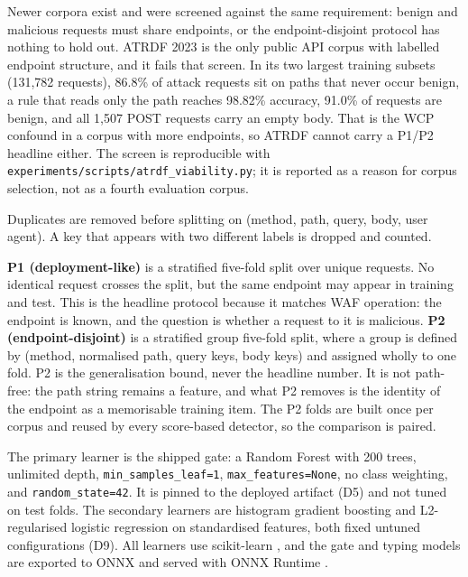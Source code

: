 \documentclass[preprint,11pt]{elsarticle}
\begin{document}
Newer corpora exist and were screened against the same requirement:
benign and malicious requests must share endpoints, or the
endpoint-disjoint protocol has nothing to hold out. ATRDF 2023
\citep{lavian2023atrdf} is the only public API corpus with labelled
endpoint structure, and it fails that screen. In its two largest
training subsets (131,782 requests), 86.8\% of attack requests sit on
paths that never occur benign, a rule that reads only the path reaches
98.82\% accuracy, 91.0\% of requests are benign, and all 1,507 POST
requests carry an empty body. That is the WCP confound in a corpus with
more endpoints, so ATRDF cannot carry a P1/P2 headline either. The
screen is reproducible with
\texttt{experiments/\allowbreak{}scripts/\allowbreak{}atrdf\_\allowbreak{}viability.\allowbreak{}py}; it is reported as a
reason for corpus selection, not as a fourth evaluation corpus.

Duplicates are removed before splitting on (method, path, query, body,
user agent). A key that appears with two different labels is dropped and
counted.

\textbf{P1 (deployment-like)} is a stratified five-fold split over
unique requests. No identical request crosses the split, but the same
endpoint may appear in training and test. This is the headline protocol
because it matches WAF operation: the endpoint is known, and the
question is whether a request to it is malicious. \textbf{P2
(endpoint-disjoint)} is a stratified group five-fold split, where a
group is defined by (method, normalised path, query keys, body keys) and
assigned wholly to one fold. P2 is the generalisation bound, never the
headline number. It is not path-free: the path string remains a feature,
and what P2 removes is the identity of the endpoint as a memorisable
training item. The P2 folds are built once per corpus and reused by
every score-based detector, so the comparison is paired.

The primary learner is the shipped gate: a Random Forest
\citep{breiman2001random} with 200 trees, unlimited depth,
\texttt{min\_\allowbreak{}samples\_\allowbreak{}leaf=1}, \texttt{max\_\allowbreak{}features=None}, no class
weighting, and \texttt{random\_\allowbreak{}state=42}. It is pinned to the deployed
artifact (D5) and not tuned on test folds. The secondary learners are
histogram gradient boosting and L2-regularised logistic regression on
standardised features, both fixed untuned configurations (D9). All
learners use scikit-learn \citep{pedregosa2011scikit}, and the gate and
typing models are exported to ONNX and served with ONNX Runtime
\citep{onnxruntime2024}.
\end{document}
